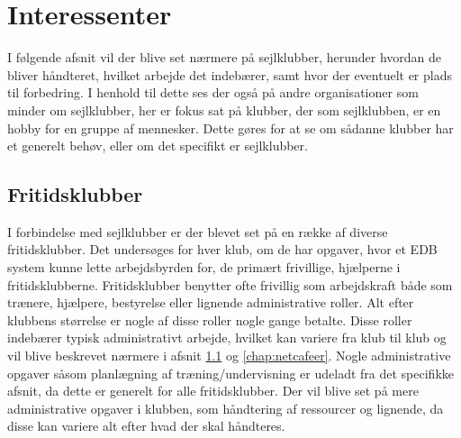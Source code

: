 \chapter{Interessenter}
\cbstart

I følgende afsnit vil der blive set nærmere på sejlklubber, herunder hvordan de bliver håndteret, hvilket arbejde det
indebærer, samt hvor der eventuelt er plads til forbedring. I henhold til dette ses der også på andre organisationer
som minder om sejlklubber, her er fokus sat på klubber, der som sejlklubben, er en hobby for en gruppe af mennesker.
Dette gøres for at se om sådanne klubber har et generelt behøv, eller om det specifikt er sejlklubber.


\section{Fritidsklubber} \label{Fritidsklub}
I forbindelse med sejlklubber er der blevet set på en række af diverse fritidsklubber. Det undersøges for hver klub, om
de har opgaver, hvor et EDB system kunne lette arbejdsbyrden for, de primært frivillige, hjælperne i fritidsklubberne.
Fritidsklubber benytter ofte frivillig som arbejdskraft både som trænere, hjælpere, bestyrelse eller lignende
administrative roller. Alt efter klubbens størrelse er nogle af disse roller nogle gange betalte. Disse roller indebærer
typisk administrativt arbejde, hvilket kan variere fra klub til klub og vil blive beskrevet nærmere i afsnit
\ref{Fritidsklub} og  \ref{chap:netcafeer}. Nogle administrative opgaver såsom planlægning af træning/undervisning er
udeladt fra det specifikke afsnit, da dette er generelt for alle fritidsklubber. Der vil  blive set på mere
administrative opgaver i klubben, som håndtering af ressourcer og lignende, da disse kan variere alt efter hvad der skal
håndteres.

%
%
